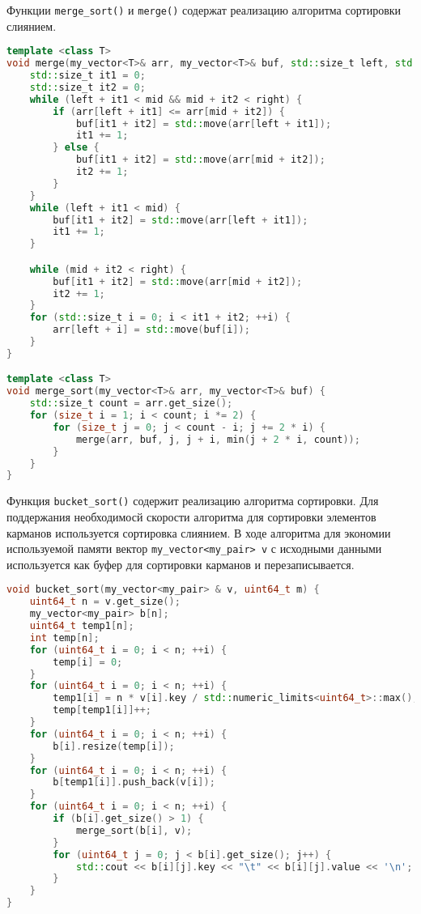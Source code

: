 \documentclass[12pt]{article}
\begin{document}
Функции \texttt{merge\_sort()} и \texttt{merge()} содержат реализацию алгоритма сортировки слиянием. 

\begin{lstlisting}[language=C++]
template <class T>
void merge(my_vector<T>& arr, my_vector<T>& buf, std::size_t left, std::size_t mid, std::size_t right) {
    std::size_t it1 = 0;
    std::size_t it2 = 0;
    while (left + it1 < mid && mid + it2 < right) {
        if (arr[left + it1] <= arr[mid + it2]) {
            buf[it1 + it2] = std::move(arr[left + it1]);
            it1 += 1;
        } else {
            buf[it1 + it2] = std::move(arr[mid + it2]);
            it2 += 1;
        }
    }
    while (left + it1 < mid) {
        buf[it1 + it2] = std::move(arr[left + it1]);
        it1 += 1;
    }

    while (mid + it2 < right) {
        buf[it1 + it2] = std::move(arr[mid + it2]);
        it2 += 1;
    }
    for (std::size_t i = 0; i < it1 + it2; ++i) {
        arr[left + i] = std::move(buf[i]);
    }
}

template <class T>
void merge_sort(my_vector<T>& arr, my_vector<T>& buf) {
    std::size_t count = arr.get_size();
    for (size_t i = 1; i < count; i *= 2) {
        for (size_t j = 0; j < count - i; j += 2 * i) {
            merge(arr, buf, j, j + i, min(j + 2 * i, count));
        }
    }
}
\end{lstlisting}

Функция \texttt{bucket\_sort()} содержит реализацию алгоритма сортировки. Для поддержания необходимосй скорости алгоритма для сортировки элементов карманов используется сортировка слиянием. В ходе алгоритма для экономии используемой памяти вектор \texttt{my_vector<my_pair> v} с исходными данными используется как буфер для сортировки карманов и перезаписывается.

\begin{lstlisting}[language=C++]
void bucket_sort(my_vector<my_pair> & v, uint64_t m) {
    uint64_t n = v.get_size();
    my_vector<my_pair> b[n];
    uint64_t temp1[n];
    int temp[n];
    for (uint64_t i = 0; i < n; ++i) {
        temp[i] = 0;
    }
    for (uint64_t i = 0; i < n; ++i) {
        temp1[i] = n * v[i].key / std::numeric_limits<uint64_t>::max();
        temp[temp1[i]]++;
    }
    for (uint64_t i = 0; i < n; ++i) {
        b[i].resize(temp[i]);
    }
    for (uint64_t i = 0; i < n; ++i) {
        b[temp1[i]].push_back(v[i]);
    }
    for (uint64_t i = 0; i < n; ++i) {
        if (b[i].get_size() > 1) {
            merge_sort(b[i], v);
        }
        for (uint64_t j = 0; j < b[i].get_size(); j++) {
            std::cout << b[i][j].key << "\t" << b[i][j].value << '\n';
        }
    }
}
\end{lstlisting}
\end{document}
